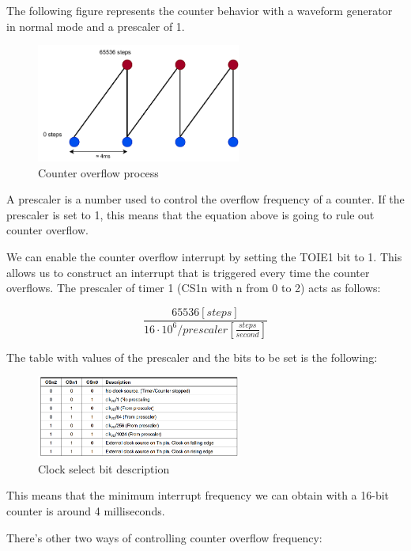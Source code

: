 \documentclass[a4paper]{article}
\begin{document}
The following figure represents the counter behavior with a waveform generator in normal mode and a prescaler of 1.

\begin{figure}[h!]
	\centering
	\includegraphics[width=0.6\textwidth]{Counter.pdf}
	\caption{Counter overflow process}
	\label{fig:counter}
\end{figure}

A prescaler is a number used to control the overflow frequency of a  counter. If the prescaler is set to 1, this means that the equation above is going to rule out counter overflow.

We can enable the counter overflow interrupt by setting the TOIE1 bit to 1. This allows us to construct an interrupt that is triggered every time the counter overflows. The prescaler of timer 1 (CS1n with n from 0 to 2) acts as follows:

\begin{equation}
	\frac{65536 [steps]}{16\cdot10^{6}/prescaler[\frac{steps}{second}]}
\end{equation}

The table with values of the prescaler and the bits to be set is the following:

\begin{figure}[h!]
	\centering
	\includegraphics[width = 0.6\textwidth]{CSn.png}
	\caption{Clock select bit description}
	\label{fig:CSn}
\end{figure}

This means that the minimum interrupt frequency we can obtain with a 16-bit counter is around 4 milliseconds. 


There's other two ways of controlling counter overflow frequency:
\end{document}
